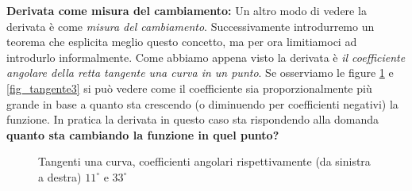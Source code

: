 \textbf{Derivata come misura del cambiamento:} Un altro modo di vedere la derivata è come \textit{misura del cambiamento}. Successivamente introdurremo un teorema che esplicita meglio questo concetto, ma per ora limitiamoci ad introdurlo informalmente. Come abbiamo appena visto la derivata è \textit{il coefficiente angolare della retta tangente una curva in un punto}. Se osserviamo le figure \ref{fig_tangente12} e \ref{fig_tangente3} si può vedere come il coefficiente sia proporzionalmente più grande in base a quanto sta crescendo (o diminuendo per coefficienti negativi) la funzione. In pratica la derivata in questo caso sta rispondendo alla domanda \textbf{quanto sta cambiando la funzione in quel punto?} 

\begin{figure}
\centering
\begin{subfigure}{0.49\textwidth}
\centering
\end{subfigure}
\begin{subfigure}{0.49\textwidth}
\centering
\end{subfigure}
\caption{Tangenti una curva, coefficienti angolari rispettivamente (da sinistra a destra) $11^\circ$ e $33^\circ$} 
\label{fig_tangente12}
\end{figure}

